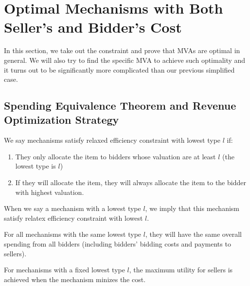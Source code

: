 \section{Optimal Mechanisms with Both Seller's and Bidder's Cost}

In this section, we take out the constraint and prove that MVAs are optimal in
general. We will also try to find the specific MVA to achieve such optimality
and it turns out to be significantly more complicated than our previous
simplified case.

\subsection{Spending Equivalence Theorem and Revenue Optimization Strategy}

\begin{definition}

We say mechanisms satisfy relaxed efficiency constraint with lowest type $l$
if:

    \begin{enumerate}

    \item They only allocate the item to bidders whose valuation are at least
    $l$ (the lowest type is $l$)

    \item If they will allocate the item, they will always allocate the item to
    the bidder with highest valuation.

    \end{enumerate}

When we say a mechanism with a lowest type $l$, we imply that this mechanism
satisfy relatex efficiency constraint with lowest $l$.

\end{definition}

\begin{theorem}

For all mechanisms with the same lowest type $l$, they will have the same
overall spending from all bidders (including bidders' bidding costs and
payments to sellers).

\end{theorem}

\begin{corollary}

For mechanisms with a fixed lowest type $l$, the maximum utility for sellers is
achieved when the mechanism minizes the cost.

\end{corollary}

